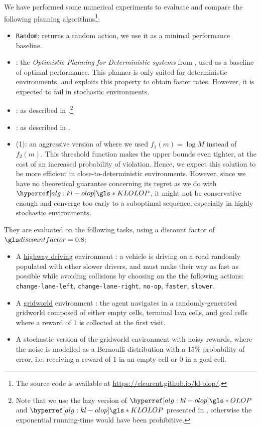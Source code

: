 We have performed some numerical experiments to evaluate and compare the following planning algorithms\footnote[1]{The source code is available at \href{https://eleurent.github.io/kl-olop/}{https://eleurent.github.io/kl-olop/}.}:
\begin{itemize}
	\item \texttt{Random}: returns a random action, we use it as a minimal performance baseline.
	\item \OPD: the \emph{Optimistic Planning for Deterministic systems} from \citep{Hren2008}, used as a baseline of optimal performance. This planner is only suited for deterministic environments, and exploits this property to obtain faster rates. However, it is expected to fail in stochastic environments.
	\item \OLOP: as described in .\footnote[2]{Note that we use the lazy version of $\OLOP$ and $\KLOLOP$ presented in , otherwise the exponential running-time would have been prohibitive.}
	\item \KLOLOP: as described in .\footnotemark[2]
	\item \KLOLOP(1): an aggressive version of \KLOLOP where we used $f_1(m) = \log M$ instead of $f_2(m)$. This threshold function makes the upper bounds even tighter, at the cost of an increased probability of violation. Hence, we expect this solution to be more efficient in close-to-deterministic environments. However, since we have no theoretical guarantee concerning its regret as we do with $\KLOLOP$, it might not be conservative enough and converge too early to a suboptimal sequence, especially in highly stochastic environments.
\end{itemize}

They are evaluated on the following tasks, using a discount factor of $\discount=0.8$:
\begin{itemize}
	\item A \href{https://github.com/eleurent/highway-env/}{highway driving} environment \citep{highway-env}: a vehicle is driving on a road randomly populated with other slower drivers, and must make their way as fast as possible while avoiding collisions by choosing on the the following actions: \texttt{change-lane-left}, \texttt{change-lane-right}, \texttt{no-op}, \texttt{faster}, \texttt{slower}.
	\item A \href{https://github.com/maximecb/gym-minigrid}{gridworld} environment \citep{gym_minigrid}: the agent navigates in a randomly-generated gridworld composed of either empty cells, terminal lava cells, and goal cells where a reward of $1$ is collected at the first visit.
	\item A stochastic version of the gridworld environment with noisy rewards, where the noise is modelled as a Bernoulli distribution with a 15\% probability of error, i.e. receiving a reward of 1 in an empty cell or 0 in a goal cell.
\end{itemize}

